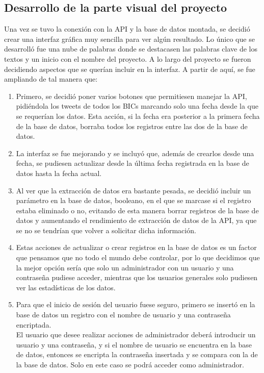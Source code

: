 \subsection{Desarrollo de la parte visual del proyecto}
Una vez se tuvo la conexión con la API y la base de datos montada, se decidió crear una interfaz gráfica muy sencilla para ver algún resultado. Lo único que se desarrolló fue una nube de palabras donde se destacasen las palabras clave de los textos y un inicio con el nombre del proyecto. 
A lo largo del proyecto se fueron decidiendo aspectos que se querían incluir en la interfaz.
A partir de aquí, se fue ampliando de tal manera que:
\begin{enumerate}
    \item Primero, se decidió poner varios botones que permitiesen manejar la API, pidiéndola los tweets de todos los BICs marcando solo una fecha desde la que se requerían los datos. Esta acción, si la fecha era posterior a la primera fecha de la base de datos, borraba todos los registros entre las dos de la base de datos.
    \item La interfaz se fue mejorando y se incluyó que, además de crearlos desde una fecha, se pudiesen actualizar desde la última fecha registrada en la base de datos hasta la fecha actual.
    \item Al ver que la extracción de datos era bastante pesada, se decidió incluir un parámetro en la base de datos, booleano, en el que se marcase si el registro estaba eliminado o no, evitando de esta manera borrar registros de la base de datos y aumentando el rendimiento de extracción de datos de la API, ya que se no se tendrían que volver a solicitar dicha información.
    \item Estas acciones de actualizar o crear registros en la base de datos es un factor que pensamos que no todo el mundo debe controlar, por lo que decidimos que la mejor opción sería que solo un administrador con un usuario y una contraseña pudiese acceder, mientras que los usuarios generales solo pudiesen ver las estadísticas de los datos.
    \item Para que el inicio de sesión del usuario fuese seguro, primero se insertó en la base de datos un registro con el nombre de usuario y una contraseña encriptada.\\
    El usuario que desee realizar acciones de administrador deberá introducir un usuario y una contraseña, y si el nombre de usuario se encuentra en la base de datos, entonces se encripta la contraseña insertada y se compara con la de la base de datos. Solo en este caso se podrá acceder como administrador.
\end{enumerate}
